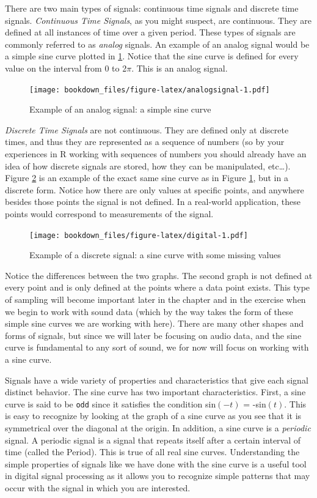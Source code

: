\documentclass[
]{krantz}
\begin{document}
There are two main types of signals: continuous time signals and discrete time signals. \emph{Continuous Time Signals}, as you might suspect, are continuous. They are defined at all instances of time over a given period. These types of signals are commonly referred to as \emph{analog} signals. An example of an analog signal would be a simple sine curve plotted in \ref{fig:analogsignal}. Notice that the sine curve is defined for every value on the interval from 0 to 2\(\pi\). This is an analog signal.

\begin{figure}
\centering
\texttt{[image: bookdown\_files/figure-latex/analogsignal-1.pdf]}
\caption{\label{fig:analogsignal}Example of an analog signal: a simple sine curve}
\end{figure}

\emph{Discrete Time Signals} are not continuous. They are defined only at discrete times, and thus they are represented as a sequence of numbers (so by your experiences in R working with sequences of numbers you should already have an idea of how discrete signals are stored, how they can be manipulated, etc\ldots). Figure \ref{fig:digital} is an example of the exact same sine curve as in Figure \ref{fig:analogsignal}, but in a discrete form. Notice how there are only values at specific points, and anywhere besides those points the signal is not defined. In a real-world application, these points would correspond to measurements of the signal.

\begin{figure}
\centering
\texttt{[image: bookdown\_files/figure-latex/digital-1.pdf]}
\caption{\label{fig:digital}Example of a discrete signal: a sine curve with some missing values}
\end{figure}

Notice the differences between the two graphs. The second graph is not defined at every point and is only defined at the points where a data point exists. This type of sampling will become important later in the chapter and in the exercise when we begin to work with sound data (which by the way takes the form of these simple sine curves we are working with here). There are many other shapes and forms of signals, but since we will later be focusing on audio data, and the sine curve is fundamental to any sort of sound, we for now will focus on working with a sine curve.

Signals have a wide variety of properties and characteristics that give each signal distinct behavior. The sine curve has two important characteristics. First, a sine curve is said to be \texttt{odd} since it satisfies the condition sin\((-t)\) = -sin\((t)\). This is easy to recognize by looking at the graph of a sine curve as you see that it is symmetrical over the diagonal at the origin. In addition, a sine curve is a \emph{periodic} signal. A periodic signal is a signal that repeats itself after a certain interval of time (called the Period). This is true of all real sine curves. Understanding the simple properties of signals like we have done with the sine curve is a useful tool in digital signal processing as it allows you to recognize simple patterns that may occur with the signal in which you are interested.
\end{document}
